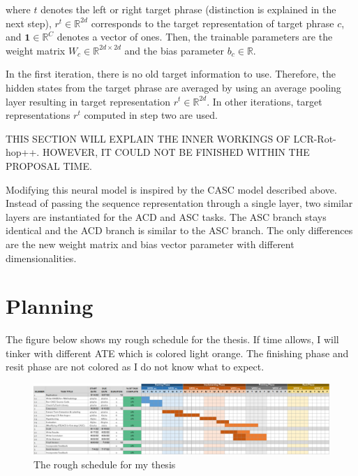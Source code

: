 \documentclass[american, oneside]{ecsgdp}
\begin{document}
\noindent where $t$ denotes the left or right target phrase (distinction is explained in the next step), $r^t \in \mathbb{R}^{2d}$ corresponds to the target representation of target phrase $c$, and $\mathbf{1} \in \mathbb{R}^{C}$ denotes a vector of ones. Then, the trainable parameters are the weight matrix $W_c \in \mathbb{R}^{2d \times 2d}$ and the bias parameter $b_c \in \mathbb{R}$.

In the first iteration, there is no old target information to use. Therefore, the hidden states from the target phrase are averaged by using an average pooling layer resulting in target representation $r^t \in \mathbb{R}^{2d}$. In other iterations, target representations $r^t$ computed in step two are used.

THIS SECTION WILL EXPLAIN THE INNER WORKINGS OF LCR-Rot-hop++. HOWEVER, IT COULD NOT BE FINISHED WITHIN THE PROPOSAL TIME.


Modifying this neural model is inspired by the CASC model described above. Instead of passing the sequence representation through a single layer, two similar layers are instantiated for the ACD and ASC tasks. The ASC branch stays identical and the ACD branch is similar to the ASC branch. The only differences are the new weight matrix and bias vector parameter with different dimensionalities.


\chapter{Planning} \label{chap:planning}
The figure below shows my rough schedule for the thesis. If time allows, I will tinker with different ATE which is colored light orange. The finishing phase and resit phase are not colored as I do not know what to expect.

\begin{figure}[htbp]
    \centering
    \includegraphics[width=1.5\textwidth, angle=90]{planning_gantt.png}
    \caption{The rough schedule for my thesis}
    \label{fig:planning}
\end{figure}
\end{document}
